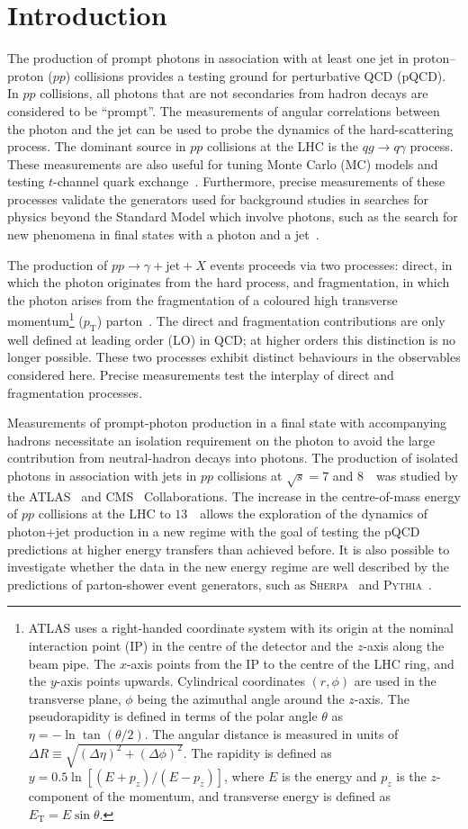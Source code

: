 \documentclass[cernpreprint,texlive=2016,txfonts,UKenglish]{latex/atlasdoc}
\newcommand{\AtlasCoordFootnote}{
ATLAS uses a right-handed coordinate system with its origin at the
nominal interaction point (IP) in the centre of the detector and the
$z$-axis along the beam pipe. The $x$-axis points from the IP to the
centre of the LHC ring, and the $y$-axis points upwards. Cylindrical
coordinates $(r,\phi)$ are used in the transverse plane, $\phi$ being
the azimuthal angle around the $z$-axis. The pseudorapidity is defined
in terms of the polar angle $\theta$ as $\eta=-\ln\tan(\theta/2)$. The
angular distance is measured in units of 
$\Delta R\equiv\sqrt{(\Delta\eta)^{2}+(\Delta\phi)^{2}}$. The rapidity
is  defined as $y=0.5\ln[(E+p_z)/(E-p_z)]$, where $E$ is the energy
and $p_z$ is the $z$-component of the momentum, and transverse energy
is defined as $E_{\mathrm T}=E\sin\theta$.}
\def\pt{p_{\mathrm{T}}}
\def\ppgj{pp\rightarrow\gamma + {\mathrm{jet}} + X}
\def\sher{{\textsc{Sherpa}}}
\def\pyt{{\textsc{Pythia}}}
\begin{document}
\maketitle

\section{Introduction}
\label{intro}

The production of prompt photons in association with at least one jet
in proton--proton ($pp$) collisions provides a testing ground for
perturbative QCD (pQCD). In $pp$ collisions, all photons that are not
secondaries from hadron decays are considered to be ``prompt''. The
measurements of angular correlations between the photon and the jet
can be used to probe the dynamics of the hard-scattering process. The
dominant source in $pp$ collisions at the LHC is the $qg\rightarrow
q\gamma$ process. These measurements are also useful for tuning Monte
Carlo (MC) models and testing $t$-channel quark
exchange~\cite{np:b875:483,np:b918:257}. Furthermore, precise
measurements of these processes validate the generators used for
background studies in searches for physics beyond the Standard Model
which involve photons, such as the search for new phenomena in final
states with a photon and a  jet~\cite{jhep:1603:041,1709.10440}.

The production of $\ppgj$ events proceeds via two processes: direct,
in which the photon originates from the hard process, and
fragmentation, in which the photon arises from the fragmentation of a
coloured high transverse momentum\footnote{\AtlasCoordFootnote}
($\pt$) parton~\cite{pr:d76:034003,pr:d79:114024}. The direct and
fragmentation contributions are only well defined at leading order
(LO) in QCD; at higher orders this distinction is no longer
possible. These two processes exhibit distinct behaviours in the
observables considered here. Precise measurements test the interplay
of direct and fragmentation processes.

Measurements of prompt-photon production in a final state with
accompanying hadrons necessitate an isolation requirement on the
photon to avoid the large contribution from neutral-hadron decays into
photons. The production of isolated photons in association with jets
in $pp$ collisions at $\sqrt s=7$ and $8$~\TeV\ was studied by the
ATLAS~\cite{pr:d85:092014,np:b875:483,np:b918:257} and
CMS~\cite{pr:d88:112009,jhep:1406:009,jhep:1510:128}
Collaborations. The increase in the centre-of-mass energy of $pp$
collisions at the LHC to $13$~\TeV\ allows the exploration of the
dynamics of photon+jet production in a new regime with the goal of
testing the pQCD predictions at higher energy transfers than achieved
before. It is also possible to investigate whether the data in the new
energy regime are well described by the predictions of parton-shower
event generators, such as \sher~\cite{jhep:0902:007} and
\pyt~\cite{cpc:178:852}.
\end{document}
